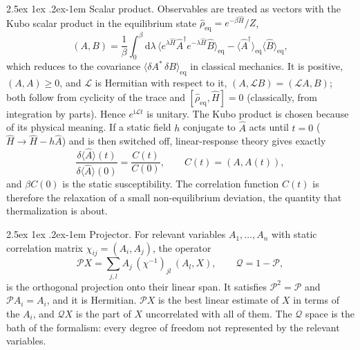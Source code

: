 \documentclass[10pt,a4paper]{article}
\makeatletter
\renewcommand{\paragraph}{\@startsection{paragraph}{4}{\z@}%
  {2.5ex \@plus 1ex \@minus .2ex}{-1em}%
  {\normalfont\fontsize{14pt}{17pt}\selectfont\bfseries}}
\newcommand{\dd}{\mathrm{d}}
\newcommand{\ii}{\mathrm{i}}
\newcommand{\sprod}[2]{\left(#1 , #2\right)}
\newcommand{\LL}{\mathcal{L}}
\newcommand{\PP}{\mathcal{P}}
\newcommand{\QQ}{\mathcal{Q}}
\makeatother
\begin{document}
\paragraph{Scalar product.}
Observables are treated as vectors with the Kubo scalar product in the equilibrium state $ \hat\rho_{\mathrm{eq}} = e^{-\beta\hat H}/Z $,
\begin{equation}
  \sprod{A}{B} = \frac{1}{\beta} \int_0^\beta \dd\lambda \, \big\langle e^{\lambda\hat H} \hat A^\dagger e^{-\lambda\hat H} \hat B \big\rangle_{\mathrm{eq}} - \langle \hat A^\dagger \rangle_{\mathrm{eq}} \langle \hat B \rangle_{\mathrm{eq}} ,
  \label{eq:kubo}
\end{equation}
which reduces to the covariance $ \langle \delta A^* \, \delta B \rangle_{\mathrm{eq}} $ in classical mechanics.
It is positive, $ \sprod{A}{A} \ge 0 $, and $ \LL $ is Hermitian with respect to it, $ \sprod{A}{\LL B} = \sprod{\LL A}{B} $; both follow from cyclicity of the trace and $ [\hat\rho_{\mathrm{eq}}, \hat H] = 0 $ (classically, from integration by parts).
Hence $ e^{\ii\LL t} $ is unitary.
The Kubo product is chosen because of its physical meaning.
If a static field $ h $ conjugate to $ \hat A $ acts until $ t = 0 $ ($ \hat H \to \hat H - h\hat A $) and is then switched off, linear-response theory gives exactly~\cite{Kubo1957}
\begin{equation}
  \frac{\delta\langle \hat A \rangle(t)}{\delta\langle \hat A \rangle(0)} = \frac{C(t)}{C(0)} ,
  \qquad
  C(t) = \sprod{A}{A(t)} ,
  \label{eq:relaxation-function}
\end{equation}
and $ \beta C(0) $ is the static susceptibility.
The correlation function $ C(t) $ is therefore the relaxation of a small non-equilibrium deviation, the quantity that thermalization is about.

\paragraph{Projector.}
For relevant variables $ A_1, \dots, A_n $ with static correlation matrix $ \chi_{ij} = \sprod{A_i}{A_j} $, the operator
\begin{equation}
  \PP X = \sum_{j,l} A_j \, (\chi^{-1})_{jl} \, \sprod{A_l}{X} ,
  \qquad
  \QQ = 1 - \PP ,
  \label{eq:projector}
\end{equation}
is the orthogonal projection onto their linear span.
It satisfies $ \PP^2 = \PP $ and $ \PP A_i = A_i $, and it is Hermitian.
$ \PP X $ is the best linear estimate of $ X $ in terms of the $ A_i $, and $ \QQ X $ is the part of $ X $ uncorrelated with all of them.
The $ \QQ $ space is the bath of the formalism: every degree of freedom not represented by the relevant variables.
\end{document}
